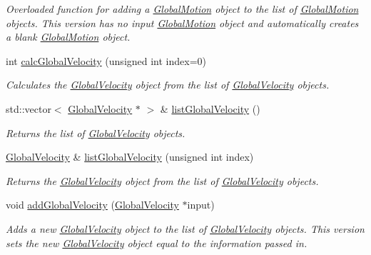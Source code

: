 \begin{DoxyCompactItemize}
\begin{DoxyCompactList}\small\item\em Overloaded function for adding a \hyperlink{classosea_1_1ofreq_1_1_global_motion}{Global\-Motion} object to the list of \hyperlink{classosea_1_1ofreq_1_1_global_motion}{Global\-Motion} objects. This version has no input \hyperlink{classosea_1_1ofreq_1_1_global_motion}{Global\-Motion} object and automatically creates a blank \hyperlink{classosea_1_1ofreq_1_1_global_motion}{Global\-Motion} object. \end{DoxyCompactList}\item 
int \hyperlink{classosea_1_1ofreq_1_1_outputs_body_a91d2e73648558390e883ba9546433577}{calc\-Global\-Velocity} (unsigned int index=0)
\begin{DoxyCompactList}\small\item\em Calculates the \hyperlink{classosea_1_1ofreq_1_1_global_velocity}{Global\-Velocity} object from the list of \hyperlink{classosea_1_1ofreq_1_1_global_velocity}{Global\-Velocity} objects. \end{DoxyCompactList}\item 
std\-::vector$<$ \hyperlink{classosea_1_1ofreq_1_1_global_velocity}{Global\-Velocity} $\ast$ $>$ \& \hyperlink{classosea_1_1ofreq_1_1_outputs_body_abfe65137648e62d545cc2d11a87db65e}{list\-Global\-Velocity} ()
\begin{DoxyCompactList}\small\item\em Returns the list of \hyperlink{classosea_1_1ofreq_1_1_global_velocity}{Global\-Velocity} objects. \end{DoxyCompactList}\item 
\hyperlink{classosea_1_1ofreq_1_1_global_velocity}{Global\-Velocity} \& \hyperlink{classosea_1_1ofreq_1_1_outputs_body_aff6a59ad46b75242919810b72e221dd9}{list\-Global\-Velocity} (unsigned int index)
\begin{DoxyCompactList}\small\item\em Returns the \hyperlink{classosea_1_1ofreq_1_1_global_velocity}{Global\-Velocity} object from the list of \hyperlink{classosea_1_1ofreq_1_1_global_velocity}{Global\-Velocity} objects. \end{DoxyCompactList}\item 
void \hyperlink{classosea_1_1ofreq_1_1_outputs_body_aa334cb10ee07542372cdcef0a7ecf750}{add\-Global\-Velocity} (\hyperlink{classosea_1_1ofreq_1_1_global_velocity}{Global\-Velocity} $\ast$input)
\begin{DoxyCompactList}\small\item\em Adds a new \hyperlink{classosea_1_1ofreq_1_1_global_velocity}{Global\-Velocity} object to the list of \hyperlink{classosea_1_1ofreq_1_1_global_velocity}{Global\-Velocity} objects. This version sets the new \hyperlink{classosea_1_1ofreq_1_1_global_velocity}{Global\-Velocity} object equal to the information passed in. \end{DoxyCompactList}\item 

\end{DoxyCompactItemize}
